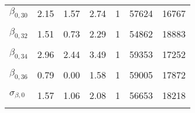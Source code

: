 \begin{table}
\begin{tabular}[t]{lrrrrrr}
$\beta_{0, 30}$ & 2.15 & 1.57 & 2.74 & 1 & 57624 & 16767\\
\cellcolor{gray!6}{$\beta_{0, 31}$} & \cellcolor{gray!6}{3.10} & \cellcolor{gray!6}{2.30} & \cellcolor{gray!6}{3.89} & \cellcolor{gray!6}{1} & \cellcolor{gray!6}{56536} & \cellcolor{gray!6}{17230}\\
$\beta_{0, 32}$ & 1.51 & 0.73 & 2.29 & 1 & 54862 & 18883\\
\cellcolor{gray!6}{$\beta_{0, 33}$} & \cellcolor{gray!6}{2.34} & \cellcolor{gray!6}{1.68} & \cellcolor{gray!6}{2.99} & \cellcolor{gray!6}{1} & \cellcolor{gray!6}{57261} & \cellcolor{gray!6}{17833}\\
$\beta_{0, 34}$ & 2.96 & 2.44 & 3.49 & 1 & 59353 & 17252\\
\cellcolor{gray!6}{$\beta_{0, 35}$} & \cellcolor{gray!6}{0.68} & \cellcolor{gray!6}{0.10} & \cellcolor{gray!6}{1.26} & \cellcolor{gray!6}{1} & \cellcolor{gray!6}{56128} & \cellcolor{gray!6}{18024}\\
$\beta_{0, 36}$ & 0.79 & 0.00 & 1.58 & 1 & 59005 & 17872\\
\cellcolor{gray!6}{$\mu_{\beta, 0}$} & \cellcolor{gray!6}{4.19} & \cellcolor{gray!6}{3.66} & \cellcolor{gray!6}{4.72} & \cellcolor{gray!6}{1} & \cellcolor{gray!6}{52625} & \cellcolor{gray!6}{18927}\\
$\sigma_{\beta, 0}$ & 1.57 & 1.06 & 2.08 & 1 & 56653 & 18218\\
\cellcolor{gray!6}{$\sigma_{y}$} & \cellcolor{gray!6}{0.73} & \cellcolor{gray!6}{0.64} & \cellcolor{gray!6}{0.83} & \cellcolor{gray!6}{1} & \cellcolor{gray!6}{23686} & \cellcolor{gray!6}{19614}\\
\bottomrule
\end{tabular}
\end{table}
